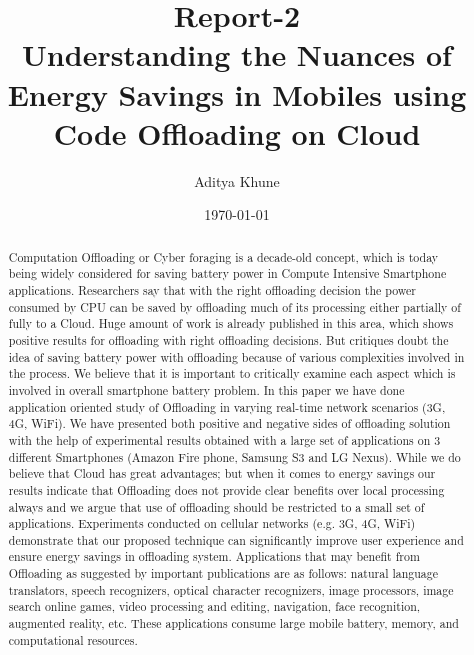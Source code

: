 \documentclass[12pt]{report}
\begin{document}
\title{Report-2\\
Understanding the Nuances of Energy Savings in Mobiles using Code Offloading on Cloud}

\author{Aditya Khune}

\date{\today}  %
\maketitle
\tableofcontents



\begin{abstract}
Computation Offloading or Cyber foraging is a decade-old concept, which is today being widely considered for saving battery power in Compute Intensive Smartphone applications. Researchers say that with the right offloading decision the power consumed by CPU can be saved by offloading much of its processing either partially of fully to a Cloud. Huge amount of work is already published in this area, which shows positive results for offloading with right offloading decisions. But critiques doubt the idea of saving battery power with offloading because of various complexities involved in the process.
We believe that it is important to critically examine each aspect which is involved in overall smartphone battery problem. In this paper we have done application oriented study of Offloading in varying real-time network scenarios (3G, 4G, WiFi). We have presented both positive and negative sides of offloading solution with the help of experimental results obtained with a large set of applications on 3 different Smartphones (Amazon Fire phone, Samsung S3 and LG Nexus). While we do believe that Cloud has great advantages; but when it comes to energy savings our results indicate that Offloading does not provide clear benefits over local processing always and we argue that use of offloading should be restricted to a small set of applications.
Experiments conducted on cellular networks (e.g. 3G, 4G, WiFi) demonstrate that our proposed technique can significantly improve user experience and ensure energy savings in offloading system.
Applications that may benefit from Offloading as suggested by important publications are as follows: natural language translators, speech recognizers, optical character recognizers, image processors, image search online games, video processing and editing, navigation, face recognition, augmented reality, etc. These applications consume large mobile battery, memory, and computational resources.
\end{abstract}
\end{document}
